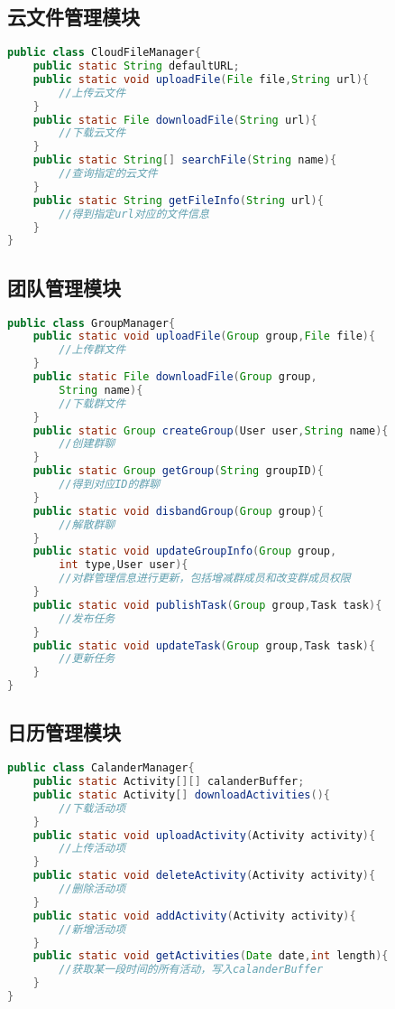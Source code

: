 \subsection{云文件管理模块}
\begin{lstlisting}[language=Java, caption=云文件管理模块接口]
public class CloudFileManager{
    public static String defaultURL;
    public static void uploadFile(File file,String url){
        //上传云文件
    }
    public static File downloadFile(String url){
        //下载云文件
    }
    public static String[] searchFile(String name){
        //查询指定的云文件
    }
    public static String getFileInfo(String url){
        //得到指定url对应的文件信息
    }
}
\end{lstlisting}

\subsection{团队管理模块}
\begin{lstlisting}[language=Java, caption=团队管理模块接口]
public class GroupManager{
    public static void uploadFile(Group group,File file){
        //上传群文件
    }
    public static File downloadFile(Group group,
        String name){
        //下载群文件
    }
    public static Group createGroup(User user,String name){
        //创建群聊
    }
    public static Group getGroup(String groupID){
        //得到对应ID的群聊
    }
    public static void disbandGroup(Group group){
        //解散群聊
    }
    public static void updateGroupInfo(Group group,
        int type,User user){
        //对群管理信息进行更新，包括增减群成员和改变群成员权限
    }
    public static void publishTask(Group group,Task task){
        //发布任务
    }
    public static void updateTask(Group group,Task task){
        //更新任务
    }
}
\end{lstlisting}

\subsection{日历管理模块}
\begin{lstlisting}[language=Java, caption=日历管理模块接口]
public class CalanderManager{
    public static Activity[][] calanderBuffer;
    public static Activity[] downloadActivities(){
        //下载活动项
    }
    public static void uploadActivity(Activity activity){
        //上传活动项
    }
    public static void deleteActivity(Activity activity){
        //删除活动项
    }
    public static void addActivity(Activity activity){
        //新增活动项
    }
    public static void getActivities(Date date,int length){
        //获取某一段时间的所有活动，写入calanderBuffer
    }
}
\end{lstlisting}

